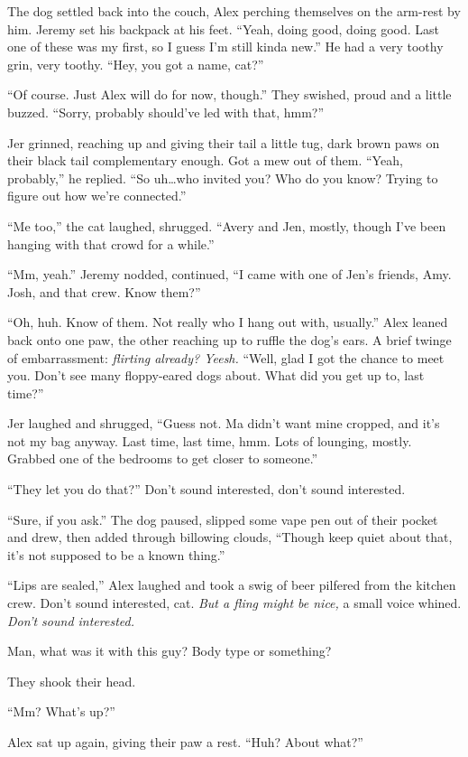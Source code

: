 The dog settled back into the couch, Alex perching themselves on the arm-rest by him. Jeremy set his backpack at his feet. ``Yeah, doing good, doing good. Last one of these was my first, so I guess I'm still kinda new.'' He had a very toothy grin, very toothy. ``Hey, you got a name, cat?''

``Of course. Just Alex will do for now, though.'' They swished, proud and a little buzzed. ``Sorry, probably should've led with that, hmm?''

Jer grinned, reaching up and giving their tail a little tug, dark brown paws on their black tail complementary enough. Got a mew out of them. ``Yeah, probably,'' he replied. ``So uh\ldots{}who invited you? Who do you know? Trying to figure out how we're connected.''

``Me too,'' the cat laughed, shrugged. ``Avery and Jen, mostly, though I've been hanging with that crowd for a while.''

``Mm, yeah.'' Jeremy nodded, continued, ``I came with one of Jen's friends, Amy. Josh, and that crew. Know them?''

``Oh, huh. Know of them. Not really who I hang out with, usually.'' Alex leaned back onto one paw, the other reaching up to ruffle the dog's ears. A brief twinge of embarrassment: \emph{flirting already? Yeesh.} ``Well, glad I got the chance to meet you. Don't see many floppy-eared dogs about. What did you get up to, last time?''

Jer laughed and shrugged, ``Guess not. Ma didn't want mine cropped, and it's not my bag anyway. Last time, last time, hmm. Lots of lounging, mostly. Grabbed one of the bedrooms to get closer to someone.''

``They let you do that?'' Don't sound interested, don't sound interested.

``Sure, if you ask.'' The dog paused, slipped some vape pen out of their pocket and drew, then added through billowing clouds, ``Though keep quiet about that, it's not supposed to be a known thing.''

``Lips are sealed,'' Alex laughed and took a swig of beer pilfered from the kitchen crew. Don't sound interested, cat. \emph{But a fling might be nice,} a small voice whined. \emph{Don't sound interested.}

Man, what was it with this guy? Body type or something?

They shook their head.

``Mm? What's up?''

Alex sat up again, giving their paw a rest. ``Huh? About what?''

